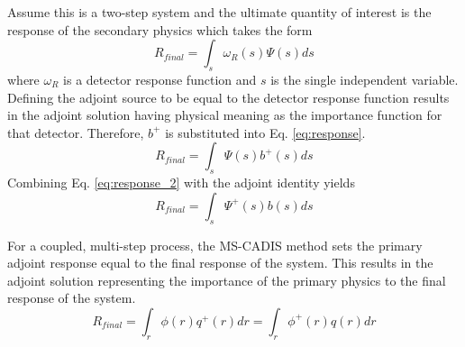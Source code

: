 Assume this is a two-step system and the ultimate quantity of interest is the 
response of the secondary physics
which takes the form
\begin{equation}\label{eq:response}
	R_{final} = \int_s \omega_R(s)  \Psi(s) ds 
\end{equation}
where $\omega_R$ is a detector response function and $s$ is the single independent
variable.
Defining the adjoint source to be equal to the detector response
function results in the adjoint solution having physical meaning as the
importance function for that detector. 
Therefore, $b^{+}$ is substituted into Eq. \ref{eq:response}.
 \begin{equation}\label{eq:response_2}
	 R_{final} = \int_s \Psi(s) b^{+}(s) ds 
 \end{equation}
Combining Eq. \ref{eq:response_2} with the adjoint identity yields
 \begin{equation}\label{eq:adj_2}
	 R_{final}= \int_s \Psi^{+}(s) b(s) ds
 \end{equation}

For a coupled, multi-step process, the MS-CADIS method 
sets the primary adjoint response equal to  
the final response of the system.  This results in the adjoint solution
representing
the importance of the primary physics to the final response of the system.
 \begin{equation}\label{eq:adj_1}
	 R_{final} = \int_r \phi(r) q^{+}(r)  dr
	 =\int_r \phi^{+}(r) q(r) dr
 \end{equation}

	 
 
